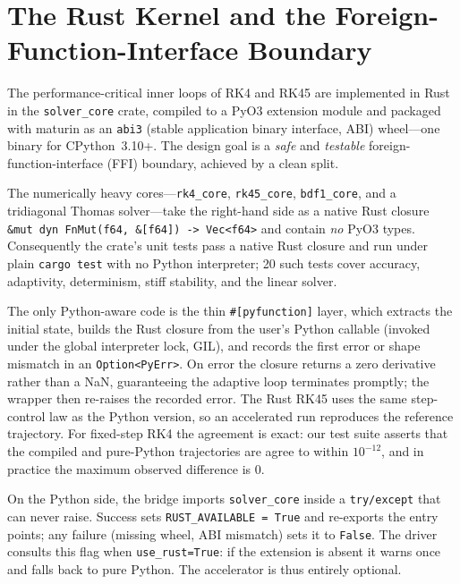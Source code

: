 \documentclass[sigplan,nonacm,screen]{acmart}
\begin{document}
\section{The Rust Kernel and the Foreign-Function-Interface Boundary}
\label{sec:rust}

The performance-critical inner loops of RK4 and RK45 are implemented in Rust in
the \texttt{solver\_core} crate, compiled to a PyO3 extension module and packaged
with maturin as an \texttt{abi3} (stable application binary interface, ABI) wheel---one
binary for CPython~3.10+. The design goal is a \emph{safe} and \emph{testable}
foreign-function-interface (FFI) boundary, achieved by a clean split.

The numerically heavy cores---\texttt{rk4\_core}, \texttt{rk45\_core},
\texttt{bdf1\_core}, and a tridiagonal Thomas solver---take the right-hand side as
a native Rust closure \lstinline[language=myrust]|&mut dyn FnMut(f64, &[f64]) -> Vec<f64>|
and contain \emph{no} PyO3 types. Consequently the crate's unit tests pass a
native Rust closure and run under plain \texttt{cargo test} with no Python
interpreter; 20 such tests cover accuracy, adaptivity, determinism, stiff
stability, and the linear solver.

The only Python-aware code is the thin \lstinline[language=myrust]|#[pyfunction]|
layer, which extracts the initial state, builds the Rust closure from the user's
Python callable (invoked under the global interpreter lock, GIL), and records the
first error or shape
mismatch in an \lstinline[language=myrust]|Option<PyErr>|. On error the closure
returns a zero derivative rather than a NaN, guaranteeing the adaptive loop
terminates promptly; the wrapper then re-raises the recorded error. The Rust
RK45 uses the same step-control law as the Python version, so an accelerated run
reproduces the reference trajectory. For fixed-step RK4 the agreement is exact:
our test suite asserts that the compiled and pure-Python trajectories are
agree to within $10^{-12}$, and in practice the maximum observed difference is
$0$.

On the Python side, the bridge imports \texttt{solver\_core} inside a
\texttt{try/except} that can never raise. Success sets
\texttt{RUST\_AVAILABLE = True} and re-exports the entry points; any failure
(missing wheel, ABI mismatch) sets it to \texttt{False}. The driver consults this
flag when \texttt{use\_rust=True}: if the extension is absent it warns once and
falls back to pure Python. The accelerator is thus entirely optional.
\end{document}

